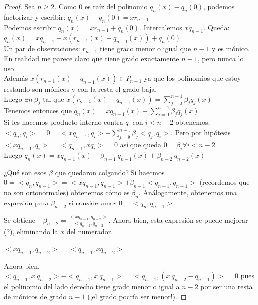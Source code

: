 \documentclass[10pt,a4paper,final]{report}
\begin{document}
\begin{proof}

Sea $n\geq 2$. Como 0 es raíz del polinomio $q_n(x) - q_n(0)$, podemos factorizar y escribir: $q_n(x) - q_n(0) = x r_{n-1}$\\

Podemos escribir $q_n(x) = x r_{n-1} + q_n(0)$. Intercalemos $x q_{n-1}$. Queda:
$q_n(x) = x q_{n-1} + x (r_{n-1}(x) - q_{n-1}(x)) + q_n(0)$\\

Un par de observaciones: $r_{n-1}$ tiene grado menor o igual que $n-1$ y es mónico. En realidad me parece claro que tiene grado exactamente $n-1$, pero nunca lo uso.\\

Además $x (r_{n-1}(x) - q_{n-1}(x)) \in P_{n-1}$ ya que los polinomios que estoy restando son mónicos y con la resta el grado baja.\\

Luego $\exists n\ \beta_j$ tal que $x (r_{n-1}(x) - q_{n-1}(x)) = \sum_{j=0}^{n-1} \beta_j q_j(x)$\\

Tenemos entonces que $q_n(x) = x q_{n-1}(x) + \sum_{j=0}^{n-1} \beta_j q_j(x)$\\

Si les hacemos producto interno contra $q_i$ con $i<n-2$ obtenemos:\\

$<q_n,q_i> = 0 = <x q_{n-1}, q_i> + \sum_{j=0}^{n-1} \beta_j <q_j,q_i>$. Pero por hipótesis $<x q_{n-1}, q_i> = <q_{n-1},x q_i>=0$ así que queda $0 = \beta_i \forall i<n-2$\\

Luego $q_n(x) = x q_{n-1}(x) + \beta_{n-1}\ q_{n-1}(x) + \beta_{n-2}\ q_{n-2}(x)$ 

¿Qué son esos $\beta$ que quedaron colgando?
Si haecmos $0=<q_n,q_{n-1}> = <x q_{n-1}, q_{n-1}> + \beta_{n-1} <q_{n-1},q_{n-1}>$ (recordemos que no son ortonormales) obtenemos cómo es $\beta_n$. Análogamente, obtenemos una expresión para $\beta_{n-2}$ si consideramos $0=<q_n,q_{n-1}>$

Se obtiene $-\beta_{n-2} = \frac{<x q_{n-1}, q_{n-2}>}{<q_{n-2},q_{n-2}}$. Ahora bien, esta expresión se puede mejorar (?), eliminando la $x$ del numerador.

$<x q_{n-1}, q_{n-2}> = <q_{n-1},x q_{n-2}>$

Ahora bien, $<q_{n-1},x\ q_{n-2}> - <q_{n-1},x\ q_{n-1}> = <q_{n-1},(x\ q_{n-2}- q_{n-1})>=0$ pues el polinomio del lado derecho tiene grado menor o igual a $n-2$ por ser una resta de mónicos de grado $n-1$ (¡el grado podría ser menor!).
\end{proof}
\end{document}
